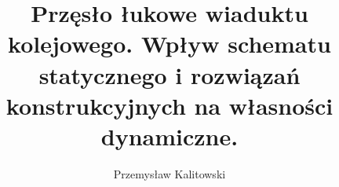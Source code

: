 
\title{Przęsło łukowe wiaduktu kolejowego. Wpływ schematu statycznego i rozwiązań konstrukcyjnych na własności dynamiczne.}
\author{Przemysław Kalitowski}










%	
%		
%		
%	
%		
%		
%
%		
%		
%		

